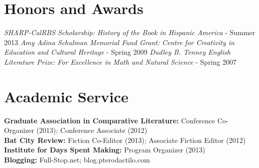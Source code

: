 \documentclass[margin,centered]{resume}
\newcommand{\employerName}[1]{\textbf{#1}}
\newcommand{\jobPosition}[1]{\textit{#1}}
\begin{document}
\begin{resume}
	
    \vspace{0mm}

    \section{\mysidestyle Honors and Awards} 

   \textsl{SHARP-CalRBS Scholarship:} \emph{History of the Book in Hispanic America} - Summer 2013
   \textsl{Amy Adina Schulman Memorial Fund Grant:} \emph{Centre for Creativity in Education and Cultural Heritage} - Spring 2009
    \textsl{Dudley B. Tenney English Literature Prize:} \emph{For Excellence in Math and Natural Science} - Spring 2007


    \section{\mysidestyle Academic Service}

    \textbf{Graduate Association in Comparative Literature:} Conference Co-Organizer (2013); Conference Associate (2012)\\
    \textbf{Bat City Review:} Fiction Co-Editor (2013); Associate Fiction Editor (2012)\\
	\textbf{Institute for Days Spent Making:} Program Organizer (2013)\\
	\textbf{Blogging:} Full-Stop.net; blog.pterodactilo.com\\
%
            

    \vspace{2mm}

\end{resume}
\end{document}
